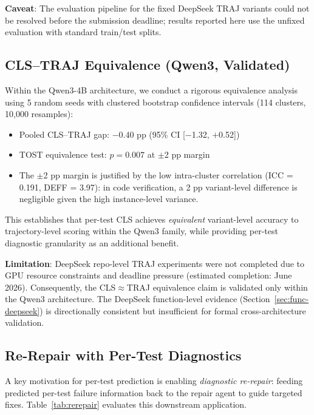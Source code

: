 \documentclass[11pt]{article}
\begin{document}
\textbf{Caveat}: The evaluation pipeline for the fixed DeepSeek TRAJ variants could not be resolved before the submission deadline; results reported here use the unfixed evaluation with standard train/test splits.

\subsection{CLS--TRAJ Equivalence (Qwen3, Validated)}
\label{sec:cls-traj}

Within the Qwen3-4B architecture, we conduct a rigorous equivalence analysis using 5 random seeds with clustered bootstrap confidence intervals (114 clusters, 10,000 resamples):

\begin{itemize}
    \item Pooled CLS--TRAJ gap: $-$0.40 pp (95\% CI [$-$1.32, $+$0.52])
    \item TOST equivalence test: $p = 0.007$ at $\pm$2 pp margin
    \item The $\pm$2 pp margin is justified by the low intra-cluster correlation (ICC = 0.191, DEFF = 3.97): in code verification, a 2 pp variant-level difference is negligible given the high instance-level variance.
\end{itemize}

This establishes that per-test CLS achieves \emph{equivalent} variant-level accuracy to trajectory-level scoring within the Qwen3 family, while providing per-test diagnostic granularity as an additional benefit.

\textbf{Limitation}: DeepSeek repo-level TRAJ experiments were not completed due to GPU resource constraints and deadline pressure (estimated completion: June 2026). Consequently, the CLS$\approx$TRAJ equivalence claim is validated only within the Qwen3 architecture. The DeepSeek function-level evidence (Section~\ref{sec:func-deepseek}) is directionally consistent but insufficient for formal cross-architecture validation.

\subsection{Re-Repair with Per-Test Diagnostics}
\label{sec:rerepair}

A key motivation for per-test prediction is enabling \emph{diagnostic re-repair}: feeding predicted per-test failure information back to the repair agent to guide targeted fixes. Table~\ref{tab:rerepair} evaluates this downstream application.
\end{document}

